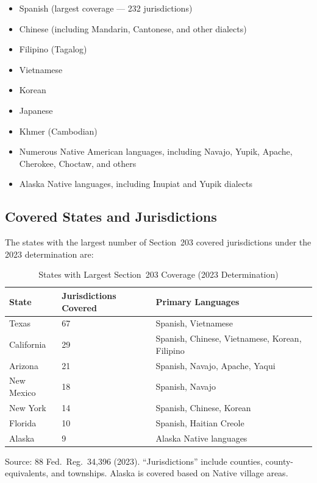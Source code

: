 \begin{itemize}
\item Spanish (largest coverage --- 232 jurisdictions)
\item Chinese (including Mandarin, Cantonese, and other dialects)
\item Filipino (Tagalog)
\item Vietnamese
\item Korean
\item Japanese
\item Khmer (Cambodian)
\item Numerous Native American languages, including Navajo, Yupik,
  Apache, Cherokee, Choctaw, and others
\item Alaska Native languages, including Inupiat and Yupik dialects
\end{itemize}

\subsection{Covered States and Jurisdictions}

The states with the largest number of Section~203 covered jurisdictions
under the 2023 determination are:

\begin{table}[ht]
\centering
\caption{States with Largest Section~203 Coverage (2023 Determination)}
\label{tab:coverage}
\begin{tabular}{lll}
\toprule
State & Jurisdictions Covered & Primary Languages \\
\midrule
Texas & 67 & Spanish, Vietnamese \\
California & 29 & Spanish, Chinese, Vietnamese, Korean, Filipino \\
Arizona & 21 & Spanish, Navajo, Apache, Yaqui \\
New Mexico & 18 & Spanish, Navajo \\
New York & 14 & Spanish, Chinese, Korean \\
Florida & 10 & Spanish, Haitian Creole \\
Alaska & 9 & Alaska Native languages \\
\bottomrule
\end{tabular}
\begin{tablenotes}
\small
\item Source: 88 Fed.\ Reg.\ 34,396 (2023). ``Jurisdictions'' include
counties, county-equivalents, and townships. Alaska is covered based
on Native village areas.
\end{tablenotes}
\end{table}

